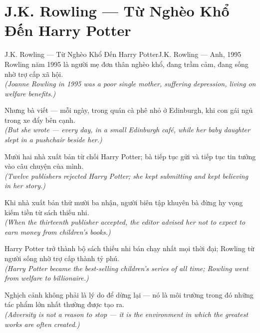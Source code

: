 \section{J.K. Rowling --- Từ Nghèo Khổ Đến Harry Potter}
\begin{truyen}{J.K. Rowling --- Từ Nghèo Khổ Đến Harry Potter}{J.K. Rowling --- Anh, 1995}
 Rowling năm 1995 là người mẹ đơn thân nghèo khổ, đang trầm cảm, đang sống nhờ trợ cấp xã hội.\\[4pt]
\textit{(Joanne Rowling in 1995 was a poor single mother, suffering depression, living on welfare benefits.)}

Nhưng bà viết --- mỗi ngày, trong quán cà phê nhỏ ở Edinburgh, khi con gái ngủ trong xe đẩy bên cạnh.\\[4pt]
\textit{(But she wrote --- every day, in a small Edinburgh café, while her baby daughter slept in a pushchair beside her.)}

Mười hai nhà xuất bản từ chối Harry Potter; bà tiếp tục gửi và tiếp tục tin tưởng vào câu chuyện của mình.\\[4pt]
\textit{(Twelve publishers rejected Harry Potter; she kept submitting and kept believing in her story.)}

Khi nhà xuất bản thứ mười ba nhận, người biên tập khuyên bà đừng hy vọng kiếm tiền từ sách thiếu nhi.\\[4pt]
\textit{(When the thirteenth publisher accepted, the editor advised her not to expect to earn money from children's books.)}

Harry Potter trở thành bộ sách thiếu nhi bán chạy nhất mọi thời đại; Rowling từ người sống nhờ trợ cấp thành tỷ phú.\\[4pt]
\textit{(Harry Potter became the best-selling children's series of all time; Rowling went from welfare to billionaire.)}

\end{truyen}
\begin{baihoc}
  Nghịch cảnh không phải là lý do để dừng lại --- nó là môi trường trong đó những tác phẩm lớn nhất thường được tạo ra.\\[4pt]
  \textit{(Adversity is not a reason to stop --- it is the environment in which the greatest works are often created.)}
\end{baihoc}

